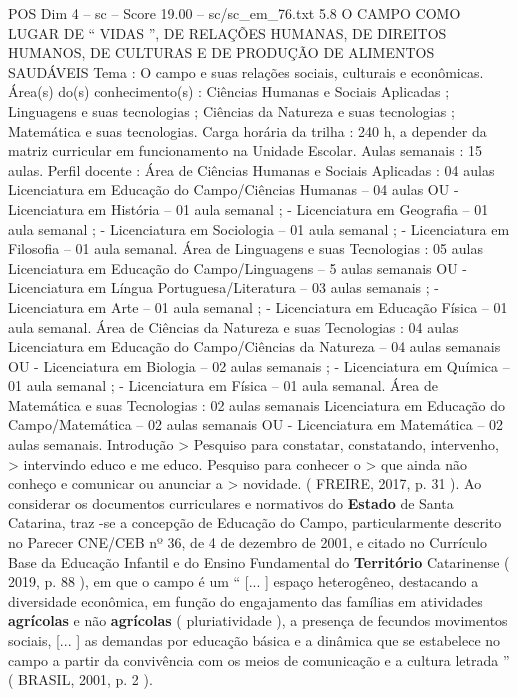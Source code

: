 \begin{textsample}{POS Dim 4 – sc – Score 19.00 – sc/sc\_em\_76.txt}  \label{ex:f4_pos_033}
5.8 O CAMPO COMO LUGAR DE “ VIDAS ”, DE RELAÇÕES HUMANAS, DE DIREITOS HUMANOS, DE CULTURAS E DE PRODUÇÃO DE ALIMENTOS SAUDÁVEIS Tema : O campo e suas relações sociais, culturais e econômicas.
Área(s) do(s) conhecimento(s) : Ciências Humanas e Sociais Aplicadas ; Linguagens e suas tecnologias ; Ciências da Natureza e suas tecnologias ; Matemática e suas tecnologias.
Carga horária da trilha : 240 h, a depender da matriz curricular em funcionamento na Unidade Escolar.
Aulas semanais : 15 aulas.
Perfil docente : Área de Ciências Humanas e Sociais Aplicadas : 04 aulas Licenciatura em Educação do Campo/Ciências Humanas – 04 aulas OU - Licenciatura em História – 01 aula semanal ; - Licenciatura em Geografia – 01 aula semanal ; - Licenciatura em Sociologia – 01 aula semanal ; - Licenciatura em Filosofia – 01 aula semanal.
Área de Linguagens e suas Tecnologias : 05 aulas Licenciatura em Educação do Campo/Linguagens – 5 aulas semanais OU - Licenciatura em Língua Portuguesa/Literatura – 03 aulas semanais ; - Licenciatura em Arte – 01 aula semanal ; - Licenciatura em Educação Física – 01 aula semanal.
Área de Ciências da Natureza e suas Tecnologias : 04 aulas Licenciatura em Educação do Campo/Ciências da Natureza – 04 aulas semanais OU - Licenciatura em Biologia – 02 aulas semanais ; - Licenciatura em Química – 01 aula semanal ; - Licenciatura em Física – 01 aula semanal.
Área de Matemática e suas Tecnologias : 02 aulas semanais Licenciatura em Educação do Campo/Matemática – 02 aulas semanais OU - Licenciatura em Matemática – 02 aulas semanais.
Introdução > Pesquiso para constatar, constatando, intervenho, > intervindo educo e me educo.
Pesquiso para conhecer o > que ainda não conheço e comunicar ou anunciar a > novidade. ( FREIRE, 2017, p. 31 ).
Ao considerar os documentos curriculares e normativos do \textbf{Estado} de Santa Catarina, traz -se a concepção de Educação do Campo, particularmente descrito no Parecer CNE/CEB nº 36, de 4 de dezembro de 2001, e citado no Currículo Base da Educação Infantil e do Ensino Fundamental do \textbf{Território} Catarinense ( 2019, p. 88 ), em que o campo é um “ [... ] espaço heterogêneo, destacando a diversidade econômica, em função do engajamento das famílias em atividades \textbf{agrícolas} e não \textbf{agrícolas} ( pluriatividade ), a presença de fecundos movimentos sociais, [... ] as demandas por educação básica e a dinâmica que se estabelece no campo a partir da convivência com os meios de comunicação e a cultura letrada ” ( BRASIL, 2001, p. 2 ).

\end{textsample}
